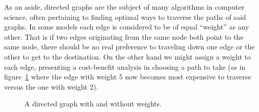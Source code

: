 \documentclass{amsart}
\theoremstyle{plain}
\theoremstyle{remark}
\theoremstyle{definition}
\begin{document}
As an aside, directed graphs are the subject of many algorithms in computer
science, often pertaining to finding optimal ways to traverse the paths of said
graphs. In some models each edge is considered to be of equal ``weight'' as any
other. That is if two edges originating from the same node both point to the
same node, there should be no real preference to traveling down one edge or the
other to get to the destination. On the other hand we might assign a weight to
each edge, presenting a cost-benefit analysis in choosing a path to take (as in
figure~\ref{fig:path-finding} where the edge with weight 5 now becomes most
expensive to traverse versus the one with weight 2).
\begin{figure}[h]
  \hspace{1cm}
  \caption{A directed graph with and without weights.}
  \label{fig:path-finding}
\end{figure}
\end{document}

